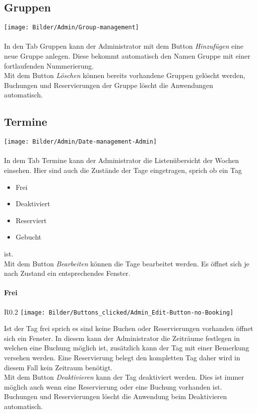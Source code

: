 \subsection{Gruppen}
	\texttt{[image: Bilder/Admin/Group-management]}
	\\
	\\	
In den Tab Gruppen kann der Administrator mit dem Button \textit{Hinzufügen} eine neue Gruppe anlegen. Diese bekommt automatisch den Namen Gruppe mit einer fortlaufenden Nummerierung.\\Mit dem Button \textit{Löschen} können bereits vorhandene Gruppen gelöscht werden, Buchungen und Reservierungen der Gruppe löscht die Anwendungen automatisch.

\subsection{Termine}
	\texttt{[image: Bilder/Admin/Date-management-Admin]}
	\\
	\\
In dem Tab Termine kann der Administrator die Listenübersicht der Wochen einsehen. Hier sind auch die Zustände der Tage eingetragen, sprich ob ein Tag
\begin{itemize}
	\item Frei 
	\item Deaktiviert 
	\item Reserviert 
	\item Gebucht
\end{itemize}
ist.
\\ Mit dem Button \textit{Bearbeiten} können die Tage bearbeitet werden. Es öffnet sich je nach Zustand ein entsprechendes Fenster.


\paragraph{Frei}
\begin{wrapfigure}{R}{0.2\textwidth}
	\centering
	\texttt{[image: Bilder/Buttons\_clicked/Admin\_Edit-Button-no-Booking]}
\end{wrapfigure}
Ist der Tag frei sprich es sind keine Buchen oder Reservierungen vorhanden öffnet sich ein Fenster. In diesem kann der Administrator die Zeiträume festlegen in welchen eine Buchung möglich ist, zusätzlich kann der Tag mit einer Bemerkung versehen werden. Eine Reservierung belegt den kompletten Tag daher wird in diesem Fall kein Zeitraum benötigt. 
\\Mit dem Button \textit{Deaktivieren} kann der Tag deaktiviert werden. Dies ist immer möglich auch wenn eine Reservierung oder eine Buchung vorhanden ist. Buchungen und Reservierungen löscht die Anwendung beim Deaktivieren automatisch.


